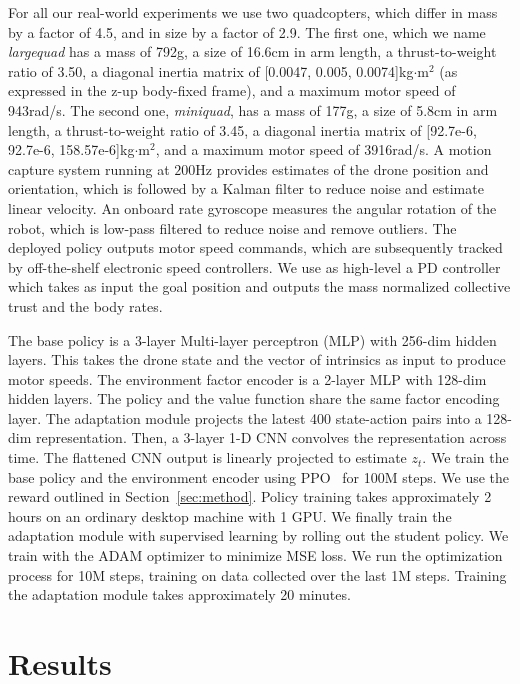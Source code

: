  For all our real-world experiments we use two quadcopters, which differ in mass by a factor of 4.5, and in size by a factor of 2.9. 
The first one, which we name \emph{largequad} has a mass of 792g, a size of 16.6cm in arm length, a thrust-to-weight ratio of 3.50, a diagonal inertia matrix of [0.0047, 0.005, 0.0074]kg$\cdot$m$^2$ (as expressed in the z-up body-fixed frame), and a maximum motor speed of 943rad/s. The second one, \emph{miniquad}, has a mass of 177g, a size of 5.8cm in arm length, a thrust-to-weight ratio of 3.45, a diagonal inertia matrix of [92.7e-6, 92.7e-6, 158.57e-6]kg$\cdot$m$^2$, and a maximum motor speed of 3916rad/s.
%
A motion capture system running at $200$Hz provides estimates of the drone position and orientation, which is followed by a Kalman filter to reduce noise and estimate linear velocity.
%
An onboard rate gyroscope measures the angular rotation of the robot, which is low-pass filtered to reduce noise and remove outliers.
%
The deployed policy outputs motor speed commands, which are subsequently tracked by off-the-shelf electronic speed controllers.
%
We use as high-level a PD controller which takes as input the goal position and outputs the mass normalized collective trust and the body rates.

 The base policy is a 3-layer Multi-layer perceptron (MLP) with 256-dim hidden layers. This takes the drone state and the vector of intrinsics as input to produce motor speeds. The environment factor encoder is a 2-layer MLP with 128-dim hidden layers.  The policy and the value function share the same factor encoding layer. The adaptation module projects the latest 400 state-action pairs into a 128-dim representation. Then, a 3-layer 1-D CNN convolves the representation across time. The flattened CNN output is linearly projected to estimate $z_t$. We train the base policy and the environment encoder using PPO~\cite{schulman2017proximal} for 100M steps. We use the reward outlined in Section~\ref{sec:method}. Policy training takes approximately 2 hours on an ordinary desktop machine with 1 GPU.
%
We finally train the adaptation module with supervised learning by rolling out the student policy. We train with the ADAM optimizer to minimize MSE loss. 
%
We run the optimization process for 10M steps, training on data collected over the last 1M steps. Training the adaptation module takes approximately 20 minutes.



\section{Results}

